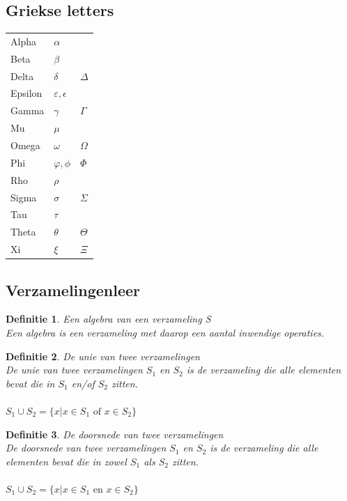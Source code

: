 \documentclass[a4paper]{article}
\newtheorem{tdefinitie}{Definitie}[section]
\newenvironment{definitie}[1]%
  {\begin{mdframed}[backgroundcolor=silver,
    topline=false,
    rightline=false,
    leftline=false,
    bottomline=false]\begin{tdefinitie}#1\\\normalfont}%
  {\end{tdefinitie}\end{mdframed}}
\newcommand{\of}{\ensuremath{\text{ of }}}
\newcommand{\en}{\ensuremath{\text{ en }}}
\begin{document}
\subsection{Griekse letters}

\begin{tabular}{l|l|l}
	Alpha & $\alpha$ & \\
	Beta & $\beta$ & \\
	Delta & $\delta$ & $\Delta$ \\
	Epsilon & $\varepsilon, \epsilon$ & \\
	Gamma & $\gamma$ & $\Gamma$ \\
	Mu & $\mu$ & \\
	Omega & $\omega$ & $\Omega$ \\
	Phi & $\varphi, \phi$ & $\Phi$ \\
	Rho & $\rho$ & \\
	Sigma & $\sigma$ & $\Sigma$ \\
	Tau & $\tau$ & \\
	Theta & $\theta$ & $\Theta$ \\
	Xi & $\xi$ & $\Xi$ \\
\end{tabular}

\subsection{Verzamelingenleer}

\begin{definitie}{Een algebra van een verzameling S}
Een algebra is een verzameling met daarop een aantal inwendige operaties.
\end{definitie}

\begin{definitie}{De unie van twee verzamelingen}
  De unie van twee verzamelingen $S_1$ en $S_2$ is de verzameling die alle elementen bevat die in $S_1$ en/of $S_2$ zitten. \\
  \\ $S_1 \cup S_2 = \{x|x \in S_1 \of x \in S_2\}$
\end{definitie}

\begin{definitie}{De doorsnede van twee verzamelingen}
  De doorsnede van twee verzamelingen $S_1$ en $S_2$ is de verzameling die alle elementen bevat die in zowel $S_1$ als $S_2$ zitten. \\
  \\ $S_1 \cup S_2 = \{x|x \in S_1 \en x \in S_2\}$
\end{definitie}
\end{document}
